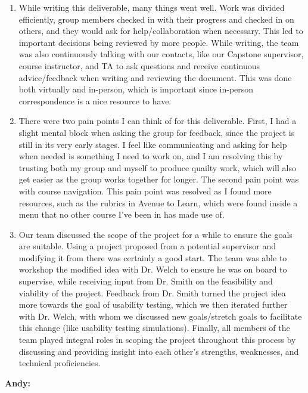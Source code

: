 \documentclass{article}
\begin{document}
\begin{enumerate}
	\item While writing this deliverable, many things went well. Work was divided 
	efficiently, group members checked in with their progress and checked in on 
	others, and they would ask for help/collaboration when necessary. This led to 
	important decisions being reviewed by more people. While writing, the team 
	was also continuously talking with our contacts, like our Capstone supervisor, 
	course instructor, and TA to ask questions and receive continuous 
	advice/feedback when writing and reviewing the document. This was done both 
	virtually and in-person, which is important since in-person correspondence is a 
	nice resource to have.
	\item There were two pain points I can think of for this deliverable. First, I had a 
	slight mental block when asking the group for feedback, since the project is still 
	in its very early stages. I feel like communicating and asking for help when 
	needed is something I need to work on, and I am resolving this by trusting both 
	my group and myself to produce quailty work, which will also get easier as the 
	group works together for longer. The second pain point was with course 
	navigation. This pain point was resolved as I found more resources, such as the 
	rubrics in Avenue to Learn, which were found inside a menu that no other 
	course I've been in has made use of.
	\item Our team discussed the scope of the project for a while to ensure the 
	goals are suitable. Using a project proposed from a potential supervisor and 
	modifying it from there was certainly a good start. The team was able to 
	workshop the modified idea with Dr. Welch to ensure he was on board to 
	supervise, while receiving input from Dr. Smith on the feasibility and viability 
	of the project. Feedback from Dr. Smith turned the project idea more towards 	
	the goal of usability testing, which we then iterated further with Dr. Welch, with 
	whom we discussed new goals/stretch goals to facilitate this change (like usability 
	testing simulations). Finally, all members of the team played integral roles in 
	scoping the project throughout this process by discussing and providing insight 
	into each other's strengths, weaknesses, and technical proficiencies.
\end{enumerate} 

\noindent \textbf{Andy: }
\end{document}
